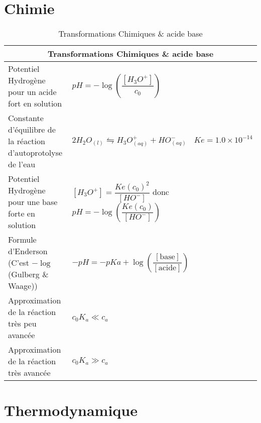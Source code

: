 \documentclass[10pt,a4paper,titlepage,landscape]{article}
\renewcommand{\arraystretch}{2}
\begin{document}
\section{Chimie}

\begin{table}[H]
    \centering
    \renewcommand{\arraystretch}{1.5} %
    \setlength{\tabcolsep}{8pt} %
    \begin{tabular}{@{}|p{9cm}|p{10cm}@{}|}

        \multicolumn{2}{c}{\textbf{Transformations Chimiques \& acide base}} \\ \hline


        Potentiel Hydrogène pour un acide fort en solution & $pH = -\log\left(\dfrac{[H_3O^+]}{c_0}\right)$ \\ \hline
        Constante d'équilibre de la réaction d'autoprotolyse de l'eau & $2H_2 O_{(l)} \leftrightharpoons H_3O^+_{(aq)} + HO^-_{(aq)} \ \ \ \ Ke = 1.0\times10^{-14}$ \\ \hline
        Potentiel Hydrogène pour une base forte en solution & $[H_3O^+] = \dfrac{Ke(c_0)^2}{[HO^-]}$ donc $pH = -\log\left(\dfrac{Ke(c_0)}{[HO^-]}\right)$ \\ \hline
        Formule d'Enderson (C'est $-\log$(Gulberg \& Waage)) & $-pH = -pKa + \log\left(\dfrac{[\text{base}]}{[\text{acide}]}\right)$ \\ \hline
        Approximation de la réaction très peu avancée & $c_0K_a \ll c_a$ \\ \hline
        Approximation de la réaction très avancée & $c_0K_a \gg c_a$ \\ \hline
\end{tabular}
\caption{Transformations Chimiques \& acide base}
\label{tab:chem}
\end{table}


\section{Thermodynamique}
\end{document}
